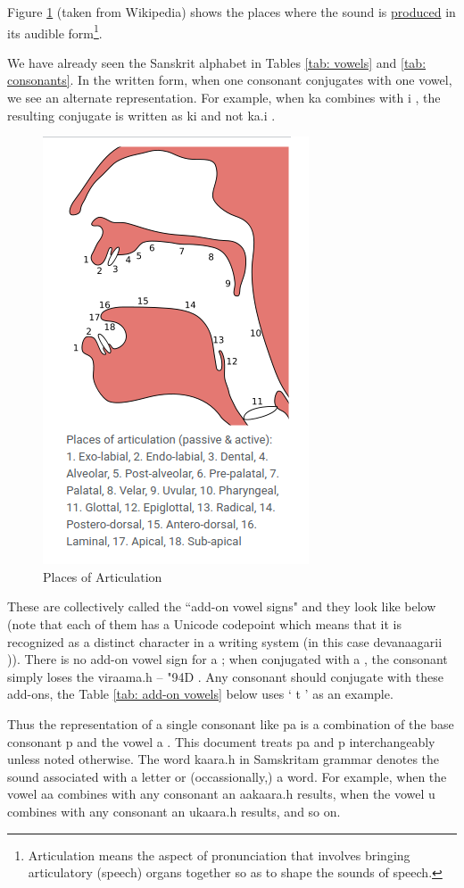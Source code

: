 \documentclass[a4paper, 12pt]{article}
\newcommand \sans[1]{
    \textsanskrit{#1}
}
\begin{document}
Figure \ref{fig: places-of-articulation} (taken from Wikipedia) shows the places where the sound is \href{https://en.wikipedia.org/wiki/Place_of_articulation}{produced} in its audible form\footnote{Articulation means the aspect of pronunciation that involves bringing articulatory (speech) organs together so as to shape the sounds of speech.}.

We have already seen the Sanskrit alphabet in Tables \ref{tab: vowels} and \ref{tab: consonants}. In the written form, when one consonant conjugates with one vowel, we see an alternate representation. For example, when \sans{ka} combines with \sans{i}, the resulting conjugate is written as \sans{ki} and not \sans{ka.i}.
\begin{figure}[htbp!]
    \centering
    \includegraphics[width=0.3\linewidth]{places-of-articulation.png}
    \caption{Places of Articulation}
    \label{fig: places-of-articulation}
\end{figure}

These are collectively called the ``add-on vowel signs" and they look like below (note that each of them has a Unicode codepoint which means that it is recognized as a distinct character in a writing system (in this case \sans{devanaagarii})). There is no add-on vowel sign for \sans{a}; when conjugated with \sans{a}, the consonant simply loses the \sans{viraama.h} -- \sans{\char"94D}. Any consonant should conjugate with these add-ons, the Table \ref{tab: add-on vowels} below uses `\sans{t}' as an example.

Thus the representation of a single consonant like \sans{pa} is a combination of the base consonant \sans{p} and the vowel \sans{a}. This document treats \sans{pa} and \sans{p} interchangeably unless noted otherwise. The word \sans{kaara.h} in Samskritam grammar denotes the sound associated with a letter or (occassionally,) a word. For example, when the vowel \sans{aa} combines with any consonant an \sans{aakaara.h} results, when the vowel \sans{u} combines with any consonant an \sans{ukaara.h} results, and so on.
\end{document}
